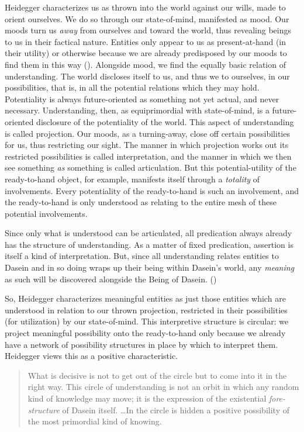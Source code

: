 \documentclass[leqno, 12pt]{turabian-researchpaper}
\begin{document}
	Heidegger characterizes us as thrown into the world against our wills, made to
	orient ourselves. We do so through our state-of-mind, manifested as mood. Our
	moods turn us \emph{away} from ourselves and toward the world, thus revealing
	beings to us in their factical nature. Entities only appear to us as present-at-hand
	(in their utility) or otherwise because we are already predisposed by our moods
	to find them in this way (). Alongside
	mood, we find the equally basic relation of understanding. The world discloses
	itself to us, and thus we to ourselves, in our possibilities, that is, in all
	the potential relations which they may hold. Potentiality is always future-oriented
	as something not yet actual, and never necessary. Understanding, then, as equiprimordial
	with state-of-mind, is a future-oriented disclosure of the potentiality of the
	world. This aspect of understanding is called projection. Our moods, as a turning-away,
	close off certain possibilities for us, thus restricting our sight. The manner
	in which projection works out its restricted possibilities is called
	interpretation, and the manner in which we then see something \emph{as}
	something is called articulation. But this potential-utility of the ready-to-hand
	object, for example, manifests itself through a \emph{totality} of
	involvements. Every potentiality of the ready-to-hand is such an involvement,
	and the ready-to-hand is only understood as relating to the entire mesh of
	these potential involvements.

	Since only what is understood can be articulated, all predication always already
	has the structure of understanding. As a matter of fixed predication, assertion
	is itself a kind of interpretation. But, since all understanding relates entities
	to Dasein and in so doing wraps up their being within Dasein's world, any
	\emph{meaning} as such will be discovered alongside the Being of Dasein. ()

	So, Heidegger characterizes meaningful entities as just those entities which are
	understood in relation to our thrown projection, restricted in their
	possibilities (for utilization) by our state-of-mind. This interpretive structure
	is circular: we project meaningful possibility onto the ready-to-hand only
	because we already have a network of possibility structures in place by which
	to interpret them. Heidegger views this as a positive characteristic.
	\blockquote[{}]{What is decisive is not to get out of the circle but to come into it in the right way. This circle of understanding is not an orbit in which any random kind of knowledge may move; it is the expression of the existential \emph{fore-structure} of Dasein itself. \dots In the circle is hidden a positive possibility of the most primordial kind of knowing.}
\end{document}
